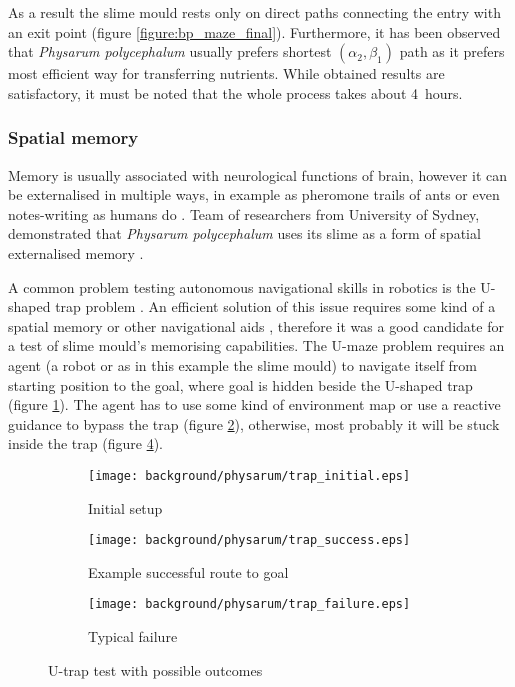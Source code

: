 As a result the slime mould rests only on direct paths connecting the entry with an exit point (figure \ref{figure:bp_maze_final}). Furthermore, it has been observed that \textit{Physarum polycephalum} usually prefers shortest $(\alpha_2,\beta_1)$ path as it prefers most efficient way for transferring nutrients. While obtained results are satisfactory, it must be noted that the whole process takes about 4~hours. 


\subsubsection{Spatial memory}

Memory is usually associated with neurological functions of brain, however it can be externalised in multiple ways, in example as pheromone trails of ants \cite{carroll1973ecology} or even notes-writing as humans do \cite{fisher1973effect}. Team of researchers from University of Sydney, demonstrated that \textit{Physarum polycephalum} uses its slime as a form of spatial externalised memory \cite{reid2012slime}.

A common problem testing autonomous navigational skills in robotics is the U-shaped trap problem \cite{chatterjee2001use}. An efficient solution of this issue requires some kind of a spatial memory or other navigational aids \cite{balch1993avoiding}, therefore it was a good candidate for a test of slime mould's memorising capabilities. The U-maze problem requires an agent (a robot or as in this example the slime mould) to navigate itself from starting position to the goal, where goal is hidden beside the U-shaped trap (figure \ref{figure:bp_trap_model}). The agent has to use some kind of environment map or use a reactive guidance to bypass the trap (figure \ref{figure:bp_trap_model_success}), otherwise, most probably it will be stuck inside the trap (figure \ref{figure:bp_trap_model_failure}).

\begin{figure}
  \centering
  \begin{subfigure}{0.33\textwidth}
    \centering
    \texttt{[image: background/physarum/trap\_initial.eps]}
    \caption{Initial setup}
    \label{figure:bp_trap_model}
  \end{subfigure}
  \begin{subfigure}{0.37\textwidth}
    \centering
    \texttt{[image: background/physarum/trap\_success.eps]}
    \caption{Example successful route to goal}
    \label{figure:bp_trap_model_success}
  \end{subfigure}
  \begin{subfigure}{0.37\textwidth}
    \centering
    \texttt{[image: background/physarum/trap\_failure.eps]}
    \caption{Typical failure}
    \label{figure:bp_trap_model_failure}
  \end{subfigure}
  \caption{U-trap test with possible outcomes}
\end{figure}

